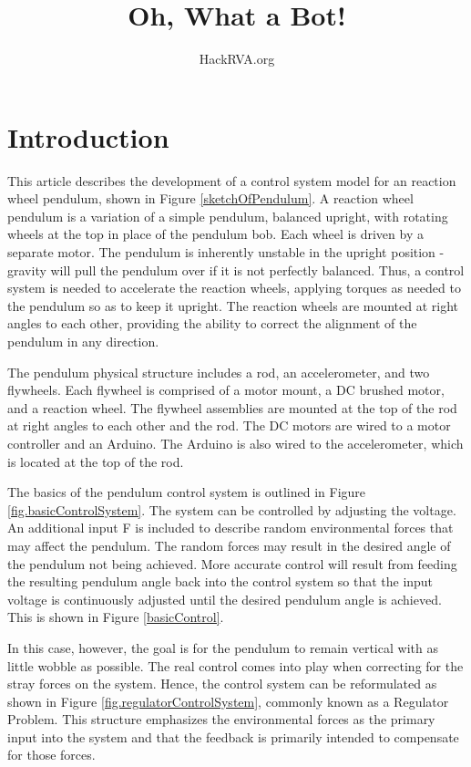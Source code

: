 \documentclass[12pt,letterpaper]{article}
\begin{document}
\title{Oh, What a Bot!}
\author{HackRVA.org}
\date{}
\maketitle

\tableofcontents

\printnomenclature[0.5in]

\section{Introduction}
This article describes the development of a control system model for an reaction wheel pendulum, shown in Figure \ref{sketchOfPendulum}.  A reaction wheel pendulum is a variation of a simple pendulum, balanced upright, with rotating wheels
at the top in place of the pendulum bob. Each wheel is driven by a separate motor.  The pendulum is inherently unstable in the upright position - gravity will pull the pendulum over if it is not perfectly balanced.  Thus, a control system is needed to accelerate the reaction wheels, applying torques
as needed to the pendulum so as to keep it upright. The reaction wheels are mounted at right angles to each other, providing the ability to 
correct the alignment of the pendulum in any direction.

The pendulum physical structure includes a rod, an accelerometer, and two flywheels.  Each
flywheel is comprised of a motor mount, a DC brushed motor, and a reaction wheel.  The flywheel assemblies are mounted at
the top of the rod at right angles to each other and the rod.  The DC motors are wired to a motor controller and an Arduino.  The Arduino is also wired
to the accelerometer, which is located at the top of the rod.

The basics of the pendulum control system is outlined in Figure \ref{fig.basicControlSystem}.  The system
can be controlled by adjusting the voltage.  An additional input F is included to describe random environmental forces that may affect the pendulum.  The random forces may result in the desired angle of the pendulum not being achieved.  More accurate control will result from feeding the resulting pendulum angle back into the control system so that the input voltage is continuously adjusted until the desired pendulum angle is achieved.  This is shown in Figure \ref{basicControl}.

In this case, however, the goal is for the pendulum to remain vertical with as little wobble as possible.
The real control comes into play when correcting for the stray forces on the system.  Hence, the control
system can be reformulated as shown in Figure \ref{fig.regulatorControlSystem}, commonly known as
a Regulator Problem.  This structure emphasizes the environmental forces as the primary input into the
system and that the feedback is primarily intended to compensate for those forces.
\end{document}
